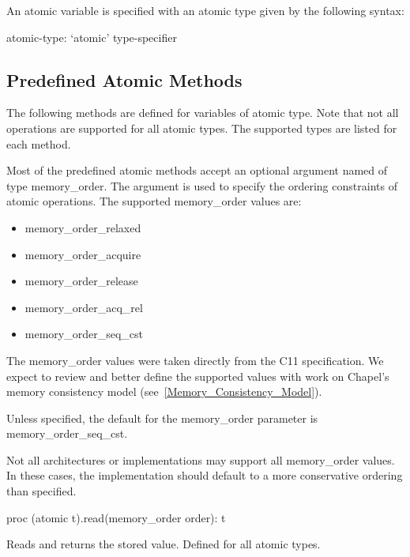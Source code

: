 An atomic variable is specified with an atomic type given by the 
following syntax:

\begin{syntax}
atomic-type:
  `atomic' type-specifier
\end{syntax}

\subsection{Predefined Atomic Methods}
\label{Functions_on_Atomic_Variables}

The following methods are defined for variables of atomic type. Note
that not all operations are supported for all atomic types. The
supported types are listed for each method.  

Most of the predefined atomic methods accept an optional argument
named  of type memory\_order. The  argument is
used to specify the ordering constraints of atomic operations. The
supported memory\_order values are:
\begin{itemize}
\item{memory\_order\_relaxed}
\item{memory\_order\_acquire}
\item{memory\_order\_release}
\item{memory\_order\_acq\_rel}
\item{memory\_order\_seq\_cst}
\end{itemize}

\begin{openissue}
  The memory\_order values were taken directly from the C11
  specification.  We expect to review and better define the supported
  values with work on Chapel's memory consistency model
  (see~\ref{Memory_Consistency_Model}).
\end{openissue}

Unless specified, the default for the memory\_order parameter is
memory\_order\_seq\_cst.

\begin{note}
Not all architectures or implementations may support all memory\_order
values.  In these cases, the implementation should default to a more
conservative ordering than specified.
\end{note}

\begin{protohead}
proc (atomic t).read(memory_order order): t
\end{protohead}
\begin{protobody}
Reads and returns the stored value. Defined for all atomic types.  
\end{protobody}

